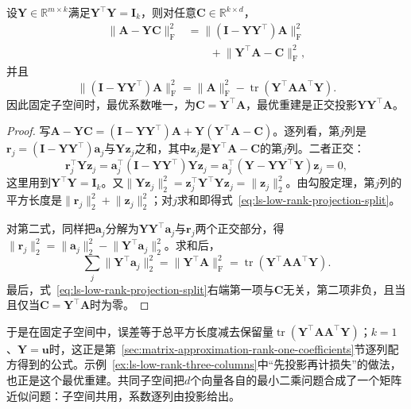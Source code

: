 \begin{lemma}[固定子空间时的正交误差分解]
\label{lem:ls-low-rank-projection-error}
设$\bm Y\in\mathbb R^{m\times k}$满足$\bm Y^\top\bm Y=\bm I_k$，则对任意$\bm C\in\mathbb R^{k\times d}$，
\begin{equation}
 \begin{aligned}
 \lVert\bm A-\bm Y\bm C\rVert_{\mathrm F}^2
 &=\lVert(\bm I-\bm Y\bm Y^\top)\bm A\rVert_{\mathrm F}^2\\
 &\qquad+\lVert\bm Y^\top\bm A-\bm C\rVert_{\mathrm F}^2,
 \end{aligned}
 \label{eq:ls-low-rank-projection-split}
\end{equation}
并且
\[
 \lVert(\bm I-\bm Y\bm Y^\top)\bm A\rVert_{\mathrm F}^2
 =\lVert\bm A\rVert_{\mathrm F}^2-\operatorname{tr}(\bm Y^\top\bm A\bm A^\top\bm Y).
\]
因此固定子空间时，最优系数唯一，为$\bm C=\bm Y^\top\bm A$，最优重建是正交投影$\bm Y\bm Y^\top\bm A$。
\end{lemma}
\begin{proof}
写$\bm A-\bm Y\bm C=(\bm I-\bm Y\bm Y^\top)\bm A+\bm Y(\bm Y^\top\bm A-\bm C)$。逐列看，第$j$列是$\bm r_j=(\bm I-\bm Y\bm Y^\top)\bm a_j$与$\bm Y\bm z_j$之和，其中$\bm z_j$是$\bm Y^\top\bm A-\bm C$的第$j$列。二者正交：
\[
 \bm r_j^\top\bm Y\bm z_j=\bm a_j^\top(\bm I-\bm Y\bm Y^\top)\bm Y\bm z_j
 =\bm a_j^\top(\bm Y-\bm Y\bm Y^\top\bm Y)\bm z_j=0 ,
\]
这里用到$\bm Y^\top\bm Y=\bm I_k$。又$\lVert\bm Y\bm z_j\rVert_2^2=\bm z_j^\top\bm Y^\top\bm Y\bm z_j=\lVert\bm z_j\rVert_2^2$。由勾股定理，第$j$列的平方长度是$\lVert\bm r_j\rVert_2^2+\lVert\bm z_j\rVert_2^2$；对$j$求和即得式~\eqref{eq:ls-low-rank-projection-split}。

对第二式，同样把$\bm a_j$分解为$\bm Y\bm Y^\top\bm a_j$与$\bm r_j$两个正交部分，得$\lVert\bm r_j\rVert_2^2=\lVert\bm a_j\rVert_2^2-\lVert\bm Y^\top\bm a_j\rVert_2^2$。求和后，
\[
 \sum_j\lVert\bm Y^\top\bm a_j\rVert_2^2=\lVert\bm Y^\top\bm A\rVert_{\mathrm F}^2
 =\operatorname{tr}(\bm Y^\top\bm A\bm A^\top\bm Y).
\]
最后，式~\eqref{eq:ls-low-rank-projection-split}右端第一项与$\bm C$无关，第二项非负，且当且仅当$\bm C=\bm Y^\top\bm A$时为零。
\end{proof}

于是在固定子空间中，误差等于总平方长度减去保留量$\operatorname{tr}(\bm Y^\top\bm A\bm A^\top\bm Y)$；$k=1$、$\bm Y=\bm u$时，这正是第~\ref{sec:matrix-approximation-rank-one-coefficients}节逐列配方得到的公式。示例~\ref{ex:ls-low-rank-three-columns}中“先投影再计损失”的做法，也正是这个最优重建。共同子空间把$d$个向量各自的最小二乘问题合成了一个矩阵近似问题：子空间共用，系数逐列由投影给出。


